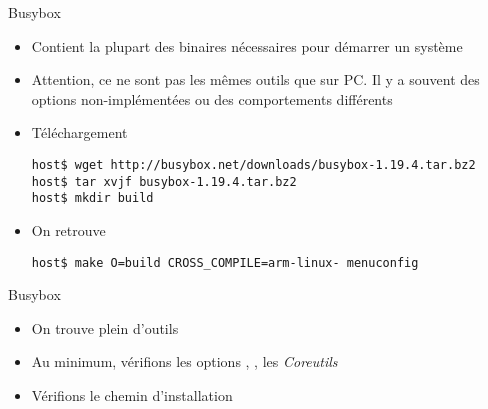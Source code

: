\begin{frame}[fragile=singleslide]{Busybox}
  \begin{itemize}
  \item  Contient la plupart  des binaires  nécessaires pour  démarrer un
    système
  \item Attention, ce ne  sont pas les mêmes outils que sur  PC. Il y a
    souvent des options non-implémentées ou des comportements différents
  \item Téléchargement
    \begin{lstlisting}
host$ wget http://busybox.net/downloads/busybox-1.19.4.tar.bz2
host$ tar xvjf busybox-1.19.4.tar.bz2
host$ mkdir build
    \end{lstlisting}
  \item On retrouve 
    \begin{lstlisting}
host$ make O=build CROSS_COMPILE=arm-linux- menuconfig
    \end{lstlisting}
  \end{itemize}
\end{frame}

\begin{frame}[fragile=singleslide]{Busybox}
  \begin{itemize}
  \item On trouve plein d'outils
  \item    Au   minimum,    vérifions les options    ,   ,    les
    \emph{Coreutils}
  \item Vérifions le chemin d'installation
  \end{itemize}
\end{frame}

